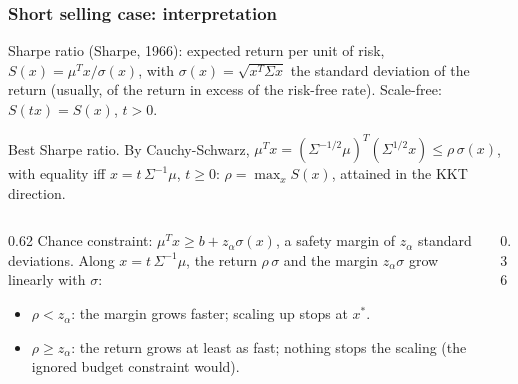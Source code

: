 \documentclass[aspectratio=169]{beamer}
\begin{document}
\begin{frame}
\frametitle{Short selling case: interpretation}

{\red Sharpe ratio} (Sharpe, 1966): expected return per unit of risk, $S(x) = \mu^Tx/\sigma(x)$, with $\sigma(x) = \sqrt{x^T\Sigma x}$ the standard deviation of the return (usually, of the return in excess of the risk-free rate). Scale-free: $S(tx) = S(x)$, $t > 0$.

\smallskip

{\red Best Sharpe ratio.} By Cauchy-Schwarz, $\mu^Tx = (\Sigma^{-1/2}\mu)^T(\Sigma^{1/2}x) \leq \rho\, \sigma(x)$, with equality iff $x = t\,\Sigma^{-1}\mu$, $t \geq 0$: $\rho = \max_x S(x)$, attained in the KKT direction.

\smallskip

\begin{columns}[T]
\begin{column}{0.62\textwidth}
{\red Chance constraint}: $\mu^Tx \geq b + z_{\alpha}\sigma(x)$, a safety margin of $z_{\alpha}$ standard deviations.
Along $x = t\,\Sigma^{-1}\mu$, the return $\rho\,\sigma$ and the margin $z_{\alpha}\sigma$ grow linearly with $\sigma$:
\begin{itemize}
\item
$\rho < z_{\alpha}$: the margin grows faster; scaling up stops at $x^*$.
\item
$\rho \geq z_{\alpha}$: the return grows at least as fast; nothing stops the scaling (the ignored budget constraint would).
\end{itemize}
\end{column}
\begin{column}{0.36\textwidth}
\end{column}
\end{columns}

\end{frame}
\end{document}
